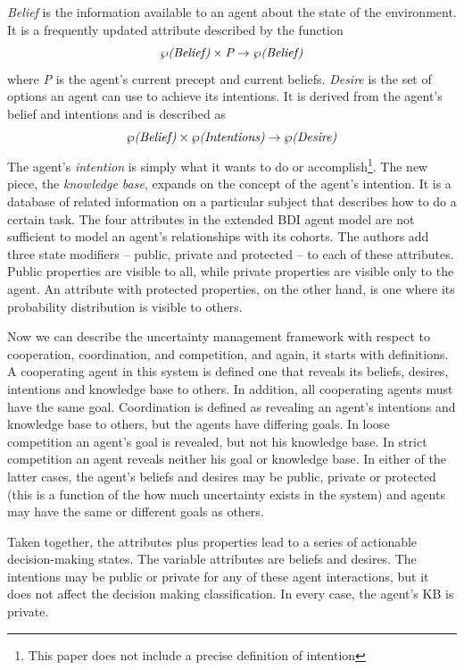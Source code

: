 \documentclass[11pt,letterpaper,onecolumn,twoside,openright,draft]{report}
\begin{document}
\emph{Belief} is the information available to an agent about the state of the environment.
It is a frequently updated attribute described by the function \[\wp\emph{(Belief)}\times \emph{P}\to\wp\emph{(Belief)}\] where \emph{P} is the agent's current precept and current beliefs.
\emph{Desire} is the set of options an agent can use to achieve its intentions.
It is derived from the agent's belief and intentions and is described as \[\wp\emph{(Belief)}\times \wp\emph{(Intentions)}\to\wp\emph{(Desire)}\]
The agent's \emph{intention} is simply what it wants to do or accomplish\footnote{This paper does not include a precise definition of intention}.
The new piece, the \emph{knowledge base}, expands on the concept of the agent's intention.
It is a database of related information on a particular subject that describes how to do a certain task.
The four attributes in the extended BDI agent model are not sufficient to model an agent's relationships with its cohorts.
The authors add three state modifiers -- public, private and protected -- to each of these attributes.
Public properties are visible to all, while private properties are visible only to the agent.
An attribute with protected properties, on the other hand, is one where its probability distribution is visible to others.

Now we can describe the uncertainty management framework with respect to cooperation, coordination, and competition, and again, it starts with definitions.
A cooperating agent in this system is defined one that reveals its beliefs, desires, intentions and knowledge base to others.
In addition, all cooperating agents must have the same goal.
Coordination is defined as revealing an agent's intentions and knowledge base to others, but the agents have differing goals.
In loose competition an agent's goal is revealed, but not his knowledge base.
In strict competition an agent reveals neither his goal or knowledge base.
In either of the latter cases, the agent's beliefs and desires may be public, private or protected (this is a function of the how much uncertainty exists in the system) and agents may have the same or different goals as others.

Taken together, the attributes plus properties lead to a series of actionable decision-making states.
The variable attributes are beliefs and desires.
The intentions may be public or private for any of these agent interactions, but it does not affect the decision making classification.
In every case, the agent's KB is private.
\end{document}
